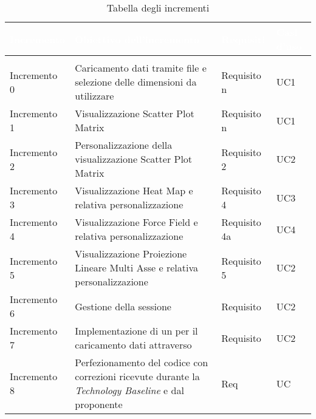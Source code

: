 \begin{longtable}{C{3cm} C{7cm} C{2cm} C{2cm}}
\textcolor{white}{\textbf{Incremento}} & 
\textcolor{white}{\textbf{Obiettivo dell'incremento}} & 
\textcolor{white}{\textbf{Requisiti}} &
\textcolor{white}{\textbf{Casi d'uso}}\\
\endfirsthead
{}\\
\endfoot
{}\caption{Tabella degli incrementi}
\endlastfoot

Incremento 0 & Caricamento dati tramite file e selezione delle dimensioni da utilizzare & Requisito n & UC1\\
Incremento 1 & Visualizzazione Scatter Plot Matrix & Requisito n & UC1 \\
Incremento 2 & Personalizzazione della visualizzazione Scatter Plot Matrix & Requisito 2 & UC2\\
Incremento 3 & Visualizzazione Heat Map e relativa personalizzazione & Requisito 4 & UC3\\
Incremento 4 & Visualizzazione Force Field e relativa personalizzazione & Requisito 4a & UC4\\
Incremento 5 & Visualizzazione Proiezione Lineare Multi Asse e relativa personalizzazione & Requisito 5 & UC2\\
Incremento 6 & Gestione della sessione & Requisito & UC2\\
Incremento 7 & Implementazione di un  per il caricamento dati attraverso  & Requisito & UC2\\
Incremento 8 & Perfezionamento del codice con correzioni ricevute durante la \textit{Technology
Baseline} e dal proponente & Req & UC \\
\end{longtable}
